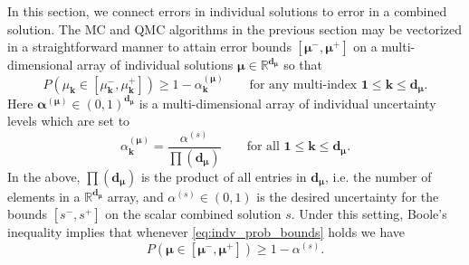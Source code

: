 \documentclass[graybox]{svmult}
\begin{document}
In this section, we connect errors in individual solutions to error in a combined solution. The MC and QMC algorithms in the previous section may be vectorized in a straightforward manner to attain error bounds $[\boldsymbol{\mu}^-,\boldsymbol{\mu}^+]$ on a multi-dimensional array of individual solutions $\boldsymbol{\mu} \in \mathbb{R}^{\boldsymbol{d}_{\boldsymbol{\mu}}}$ so that 
\begin{equation}
    P(\mu_{\boldsymbol{k}} \in [\mu_{\boldsymbol{k}}^-,\mu_{\boldsymbol{k}}^+]) \geq 1-\alpha_{\boldsymbol{k}}^{(\boldsymbol{\mu})}  \qquad \text{for any multi-index }\boldsymbol{1} \leq \boldsymbol{k} \leq \boldsymbol{d}_{\boldsymbol{\mu}}.
    \label{eq:indv_prob_bounds}
\end{equation}
Here $\boldsymbol{\alpha}^{(\boldsymbol{\mu})} \in (0,1)^{\boldsymbol{d}_{\boldsymbol{\mu}}}$ is a multi-dimensional array of individual uncertainty levels which are set to 
\begin{equation}
    \alpha_{\boldsymbol{k}}^{(\boldsymbol{\mu})} = \frac{\alpha^{(s)}}{\prod(\boldsymbol{d}_{\boldsymbol{\mu}})}
    \label{eq:alpha_mu_from_alpha_s} \qquad \text{for all }\boldsymbol{1} \leq \boldsymbol{k} \leq \boldsymbol{d}_{\boldsymbol{\mu}}.
\end{equation}
In the above, $\prod(\boldsymbol{d}_{\boldsymbol{\mu}})$ is the product of all entries in $\boldsymbol{d}_{\boldsymbol{\mu}}$, i.e. the number of elements in a $\mathbb{R}^{\boldsymbol{d}_{\boldsymbol{\mu}}}$ array, and $\alpha^{(s)} \in (0,1)$ is the desired uncertainty for the bounds $[s^-,s^+]$ on the scalar combined solution $s$. Under this setting, Boole's inequality \cite{boole1847mathematical} implies that whenever \eqref{eq:indv_prob_bounds} holds we have
\begin{equation}
    P(\boldsymbol{\mu} \in [\boldsymbol{\mu}^-,\boldsymbol{\mu}^+]) \geq 1-\alpha^{(s)}.
    \label{eq:indv_prob_bounds_all}
\end{equation} 
\end{document}
